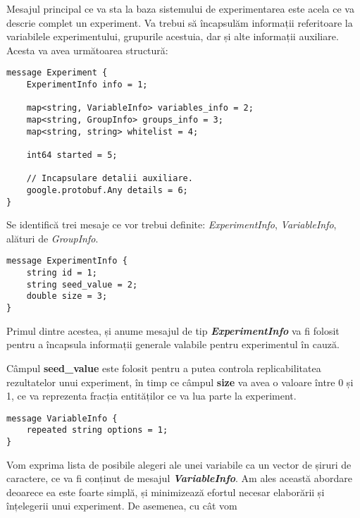 Mesajul principal ce va sta la baza sistemului de experimentarea este acela ce va descrie complet un experiment. Va trebui să încapsulăm informații referitoare la variabilele experimentului, grupurile acestuia, dar și alte informații auxiliare. Acesta va avea următoarea structură:

\begin{center}
	\begin{lstlisting}[language=proto3]
message Experiment {
	ExperimentInfo info = 1;
	
	map<string, VariableInfo> variables_info = 2;
	map<string, GroupInfo> groups_info = 3;
	map<string, string> whitelist = 4;
	
	int64 started = 5;
	
	// Incapsulare detalii auxiliare.
	google.protobuf.Any details = 6;
}
	\end{lstlisting}
\end{center}

Se identifică trei mesaje ce vor trebui definite: \textit{ExperimentInfo}, \textit{VariableInfo}, alături de \textit{GroupInfo}.

\begin{center}
	\begin{lstlisting}[language=proto3]
message ExperimentInfo {
	string id = 1;
	string seed_value = 2;
	double size = 3;
}
	\end{lstlisting}
\end{center}

Primul dintre acestea, și anume mesajul de tip \textbf{\textit{ExperimentInfo}} va fi folosit pentru a încapsula informații generale valabile pentru experimentul în cauză.

\begin{remark}
	Câmpul \textbf{seed\_value} este folosit pentru a putea controla replicabilitatea rezultatelor unui experiment, în timp ce câmpul \textbf{size} va avea o valoare între 0 și 1, ce va reprezenta fracția entităților ce va lua parte la experiment.
\end{remark}

\begin{lstlisting}[language=proto3]
message VariableInfo {
	repeated string options = 1;
}
\end{lstlisting}

Vom exprima lista de posibile alegeri ale unei variabile ca un vector de șiruri de caractere, ce va fi conținut de mesajul \textbf{\textit{VariableInfo}}. Am ales această abordare deoarece ea este foarte simplă, și minimizează efortul necesar elaborării și înțelegerii unui experiment. De asemenea, cu cât vom

